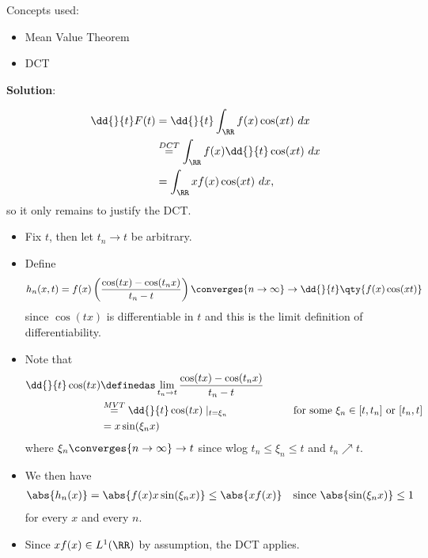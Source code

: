 \begin{solution}

Concepts used:

\begin{itemize}
\tightlist
\item
  Mean Value Theorem
\item
  DCT
\end{itemize}

\textbf{Solution}:

\begin{align*}
\dd{}{t} F(t) 
&= \dd{}{t} \int_\RR f(x) \cos(xt) ~dx \\
&\overset{DCT}= \int_\RR f(x) \dd{}{t} \cos(xt) ~dx \\
&= \int_\RR xf(x) \cos(xt)~dx
,\end{align*} so it only remains to justify the DCT.

\begin{itemize}
\item
  Fix \(t\), then let \(t_n \to t\) be arbitrary.
\item
  Define
  \begin{align*}
  h_n(x, t) = f(x)
  \left(\frac{\cos(tx) - \cos(t_n x)}{t_n - t}\right) \converges{n\to\infty}\to \dd{}{t} \qty{f(x) \cos(xt)}
  \end{align*} since \(\cos(tx)\) is differentiable in \(t\) and this is
  the limit definition of differentiability.
\item
  Note that
  \begin{align*}
  \dd{}{t} \cos(tx) 
  &\definedas \lim_{t_n \to t} \frac{\cos(tx) - \cos(t_n x)}{t_n - t} \\
  &\overset{MVT} = \dd{}{t}\cos(tx)\mid_{t  = \xi_n} \hspace{6em} \text{for some } \xi_n \in [t, t_n] \text{ or } [t_n, t] \\
  &= x\sin(\xi_n x)
  \end{align*} where \(\xi_n \converges{n\to\infty}\to t\) since wlog
  \(t_n \leq \xi_n \leq t\) and \(t_n \nearrow t\).
\item
  We then have
  \begin{align*}\abs{h_n(x)} = \abs{f(x) x\sin(\xi_n x)} \leq \abs{xf(x)}\quad\text{since } \abs{\sin(\xi_n x)} \leq  1\end{align*}
  for every \(x\) and every \(n\).
\item
  Since \(xf(x) \in L^1(\RR)\) by assumption, the DCT applies.
\end{itemize}

\end{solution}

